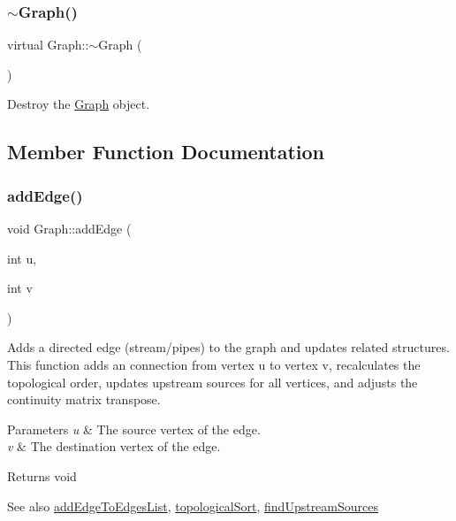 \mbox{\label{classGraph_a1621cd1ffcf6a135cbc7e039c305627b}} 
\subsubsection{\texorpdfstring{$\sim$\+Graph()}{~Graph()}}
{\footnotesize\ttfamily virtual Graph\+::$\sim$\+Graph (\begin{DoxyParamCaption}{ }\end{DoxyParamCaption})\hspace{0.3cm}{\ttfamily [virtual]}}



Destroy the \mbox{\hyperlink{classGraph}{Graph}} object. 



\subsection{Member Function Documentation}
\mbox{\label{classGraph_ad8c10df34357b2cd865c81e0c4f0bd8c}} 
\subsubsection{\texorpdfstring{add\+Edge()}{addEdge()}}
{\footnotesize\ttfamily void Graph\+::add\+Edge (\begin{DoxyParamCaption}\item[{int}]{u,  }\item[{int}]{v }\end{DoxyParamCaption})}



Adds a directed edge (stream/pipes) to the graph and updates related structures. This function adds an connection from vertex {\ttfamily u} to vertex {\ttfamily v}, recalculates the topological order, updates upstream sources for all vertices, and adjusts the continuity matrix transpose. 


\begin{DoxyParams}{Parameters}
{\em u} & The source vertex of the edge. \\
\hline
{\em v} & The destination vertex of the edge.\\
\hline
\end{DoxyParams}
\begin{DoxyReturn}{Returns}
void
\end{DoxyReturn}
\begin{DoxySeeAlso}{See also}
\mbox{\hyperlink{classGraph_a6f175234dc3c87150a53eab5c4e586ef}{add\+Edge\+To\+Edges\+List}}, \mbox{\hyperlink{classGraph_a915f9d58884a00083bb6e5a256141fae}{topological\+Sort}}, \mbox{\hyperlink{classGraph_a95b0b6a7689c519d38e820cc3f86fc70}{find\+Upstream\+Sources}} 
\end{DoxySeeAlso}
\mbox{\label{classGraph_a6f175234dc3c87150a53eab5c4e586ef}} 
